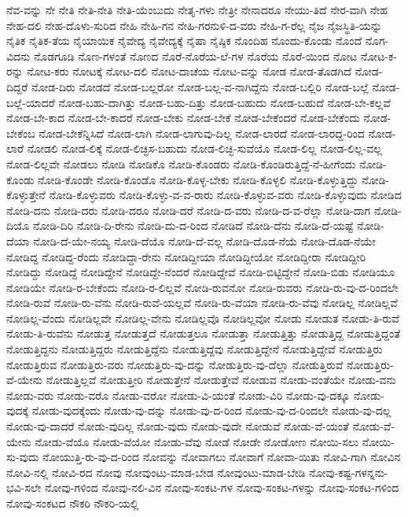 {ನೆವ-ವನ್ನು
ನೇ
ನೇತಿ
ನೇತಿ-ನೇತಿ
ನೇತಿ-ಯೆಂಬುದು
ನೇತೃ-ಗಳು
ನೇತ್ರೀ
ನೇನಾದರೂ
ನೇಯು-ತಿದೆ
ನೇರ-ವಾಗಿ
ನೇಹ
ನೇಹ-ದಲಿ
ನೇಹ-ದೊಳು-ಸುರಿದ
ನೇಹಿ
ನೇಹಿ-ಗನ
ನೇಹಿ-ಗರನುಳಿ-ದ-ವರು
ನೇಹಿ-ಗ-ರೆಲ್ಲ
ನೈಜ
ನೈಜಸ್ಥಿತಿ-ಯನ್ನು
ನೈತಿಕ
ನೈತಿಕ-ತೆಯ
ನೈಯಾಯಿಕ
ನೈವೇದ್ಯ
ನೈವೇದ್ಯಕ್ಕೆ
ನೈಷಾ
ನೈಷ್ಠಿಕ
ನೊಂದಿಹ
ನೊಂದು-ಕೊಂಡು
ನೊಂದೆ
ನೊಗ-ವಿದನು
ನೊಡಗೂಡಿ
ನೊಣ-ಗಳಂತೆ
ನೊಣದ
ನೊರೆ-ನೊರೆಯ-ಲೆ-ಗಳ
ನೊರೆಯ
ನೊರೆ-ಯಿಂದ
ನೋಟ
ನೋಟ-ಕ-ರನ್ನು
ನೋಟ-ಕರು
ನೋಟಕ್ಕೆ
ನೋಟ-ದಲಿ
ನೋಟ-ದಾಚೆಯ
ನೋಟ-ವನ್ನು
ನೋಡ
ನೋಡ-ತೊಡಗಿದೆ
ನೋಡ-ದಿದ್ದರೆ
ನೋಡ-ದಿರು
ನೋಡದೆ
ನೋಡ-ಬಲ್ಲರೋ
ನೋಡ-ಬಲ್ಲ-ವ-ನಾಗಿದ್ದೆನು
ನೋಡ-ಬಲ್ಲಿರಿ
ನೋಡ-ಬಲ್ಲೆ
ನೋಡ-ಬಲ್ಲೆ-ಯಾದರೆ
ನೋಡ-ಬಹು-ದಾಗಿತ್ತು
ನೋಡ-ಬಹು-ದಿತ್ತು
ನೋಡ-ಬಹುದು
ನೋಡ-ಬಹುದೆ
ನೋಡ-ಬೇ-ಕಲ್ಲವೆ
ನೋಡ-ಬೇ-ಕಾದ
ನೋಡ-ಬೇ-ಕಾದರೆ
ನೋಡ-ಬೇಕು
ನೋಡ-ಬೇಕೆ
ನೋಡ-ಬೇಕೆಂದರೆ
ನೋಡ-ಬೇಕೆಂದು
ನೋಡ-ಬೇಕೆಂಬ
ನೋಡ-ಬೇಕೆನ್ನಿಸಿದೆ
ನೋಡ-ಲಾಗಿ
ನೋಡ-ಲಾಗುವು-ದಿಲ್ಲ
ನೋಡ-ಲಾರದೆ
ನೋಡ-ಲಾರದ್ದ-ರಿಂದ
ನೋಡ-ಲಾರೆ
ನೋಡಲಿ
ನೋಡ-ಲಿಕ್ಕೆ
ನೋಡ-ಲಿಚ್ಛಿಸ-ಬಹುದು
ನೋಡ-ಲಿಚ್ಛಿ-ಸುವೆಯೊ
ನೋಡ-ಲಿಲ್ಲ
ನೋಡ-ಲಿಲ್ಲ-ವಲ್ಲ
ನೋಡ-ಲಿಲ್ಲವೇ
ನೋಡಲು
ನೋಡಿ
ನೋಡಿಕೊ
ನೋಡಿ-ಕೊಂಡರು
ನೋಡಿ-ಕೊಂಡಿರುತ್ತಿದ್ದೆ-ನೆ-ಹೀಗೆಂದು
ನೋಡಿ-ಕೊಂಡು
ನೋಡಿ-ಕೊಂಡೇ
ನೋಡಿ-ಕೊಂಡೊ
ನೋಡಿ-ಕೊಳ್ಳ-ಬೇಕು
ನೋಡಿ-ಕೊಳ್ಳಲಿ
ನೋಡಿ-ಕೊಳ್ಳುತ್ತಿದ್ದು
ನೋಡಿ-ಕೊಳ್ಳುತ್ತೇನೆ
ನೋಡಿ-ಕೊಳ್ಳುವರು
ನೋಡಿ-ಕೊಳ್ಳು-ವ-ವ-ರಾರು
ನೋಡಿ-ಕೊಳ್ಳುವ-ವರು
ನೋಡಿ-ಕೊಳ್ಳುವುದು
ನೋಡಿದ
ನೋಡಿ-ದನು
ನೋಡಿ-ದರು
ನೋಡಿ-ದರೂ
ನೋಡಿ-ದರೆ
ನೋಡಿ-ದ-ವರು
ನೋಡಿ-ದ-ವ-ರೆಲ್ಲಾ
ನೋಡಿ-ದಾಗ
ನೋಡಿ-ದಿಯೊ
ನೋಡಿ-ದಿರಿ
ನೋಡಿ-ದಿ-ರೇನು
ನೋಡಿ-ದು-ದ-ರಿಂದ
ನೋಡಿದೆ
ನೋಡಿ-ದೆನು
ನೋಡಿ-ದೆ-ಯಷ್ಟೆ
ನೋಡಿ-ದೆಯಾ
ನೋಡಿ-ದೆ-ಯೇ-ನಯ್ಯ
ನೋಡಿ-ದೆಯೊ
ನೋಡಿ-ದೆ-ವಲ್ಲ
ನೋಡಿ-ದೊಡ-ನೆಯೆ
ನೋಡಿ-ದೊಡ-ನೆಯೇ
ನೋಡಿದ್ದ
ನೋಡಿದ್ದ-ರೆಂದು
ನೋಡಿದ್ದಾ-ರೇನು
ನೋಡಿದ್ದೀಯಾ
ನೋಡಿದ್ದೀಯೋ
ನೋಡಿದ್ದೀರಾ
ನೋಡಿದ್ದೀರಿ
ನೋಡಿದ್ದು
ನೋಡಿದ್ದೆ
ನೋಡಿದ್ದೇನೆ
ನೋಡಿದ್ದೇ-ನೆಂದರೆ
ನೋಡಿದ್ದೇವೆ
ನೋಡಿ-ಬಿಟ್ಟಿದ್ದೇನೆ
ನೋಡಿ-ಬಿಡು
ನೋಡಿಯೂ
ನೋಡಿಯೇ
ನೋಡಿ-ರ-ಬೇಕೆಂದು
ನೋಡಿ-ರ-ಲಿಲ್ಲವೆ
ನೋಡಿ-ರುವನೋ
ನೋಡಿ-ರುವರು
ನೋಡಿ-ರು-ವು-ದ-ರಿಂದಲೇ
ನೋಡಿ-ರುವೆ
ನೋಡಿ-ರು-ವೆನು
ನೋಡಿ-ರುವೆ-ಯಲ್ಲವೆ
ನೋಡಿ-ರು-ವೆಯಾ
ನೋಡಿ-ರು-ವೆವು
ನೋಡಿಲ್ಲ
ನೋಡಿಲ್ಲವೆ
ನೋಡಿಲ್ಲ-ವೆಂದು
ನೋಡಿಲ್ಲವೇ
ನೋಡಿಲ್ಲ-ವೇನು
ನೋಡಿಲ್ಲವೊ
ನೋಡಿಲ್ಲವೋ
ನೋಡು
ನೋಡುತ
ನೋಡು-ತಿ-ರುವೆ
ನೋಡು-ತಿ-ರುವೆನು
ನೋಡುತ್ತ
ನೋಡುತ್ತದೆ
ನೋಡುತ್ತಲೂ
ನೋಡುತ್ತಾ
ನೋಡುತ್ತಿತ್ತು
ನೋಡುತ್ತಿದ್ದ
ನೋಡುತ್ತಿದ್ದಂತೆ
ನೋಡುತ್ತಿದ್ದನು
ನೋಡುತ್ತಿದ್ದರು
ನೋಡುತ್ತಿದ್ದೆನು
ನೋಡುತ್ತಿದ್ದೆವು
ನೋಡುತ್ತಿದ್ದೇನೆ
ನೋಡುತ್ತಿದ್ದೇವೆ
ನೋಡುತ್ತಿರು
ನೋಡುತ್ತಿರುವ
ನೋಡುತ್ತಿರು-ವರು
ನೋಡುತ್ತಿರು-ವು-ದನ್ನು
ನೋಡುತ್ತಿರು-ವು-ದೆಲ್ಲಾ
ನೋಡುತ್ತಿರುವೆ
ನೋಡುತ್ತಿರು-ವೆ-ಯೇನು
ನೋಡುತ್ತಿಲ್ಲವೆ
ನೋಡುತ್ತೀರಿ
ನೋಡುತ್ತೇನೆ
ನೋಡುತ್ತೇವೆ
ನೋಡುವ
ನೋಡು-ವಂತೆಯೇ
ನೋಡು-ವನು
ನೋಡು-ವರು
ನೋಡು-ವರೊ
ನೋಡು-ವರೋ
ನೋಡು-ವಿ-ಯಂತೆ
ನೋಡು-ವಿರಿ
ನೋಡು-ವು-ದಕ್ಕೂ
ನೋಡು-ವುದಕ್ಕೆ
ನೋಡು-ವುದಕ್ಕೆಂದು
ನೋಡು-ವು-ದನ್ನು
ನೋಡು-ವು-ದ-ರಿಂದ
ನೋಡು-ವು-ದ-ರಿಂದಲೇ
ನೋಡು-ವು-ದಲ್ಲ
ನೋಡು-ವು-ದಾದರೆ
ನೋಡು-ವುದಿಲ್ಲ
ನೋಡು-ವುದು
ನೋಡು-ವುದೇ
ನೋಡುವೆ
ನೋಡು-ವೆ-ಯಂತೆ
ನೋಡು-ವೆ-ಯೇನು
ನೋಡು-ವೆಯೊ
ನೋಡು-ವೆಯೋ
ನೋಡು-ವೆವು
ನೋಡೆ
ನೋಡೇ
ನೋಡೋಣ
ನೋಯಿ-ಸಲು
ನೋಯಿ-ಸು-ವುದು
ನೋಯುತ್ತಿ-ರು-ವು-ದ-ರಿಂದ
ನೋವನ್ನು
ನೋವಾಗಲು
ನೋವಾಗೆ
ನೋವಾ-ಯಿತು
ನೋವಿ-ಗಾಗಿ
ನೋವಿನ
ನೋವಿ-ನಲ್ಲಿ
ನೋವಿ-ರದ
ನೋವು
ನೋವುಂಟು-ಮಾಡ-ಬೇಡ
ನೋವುಂಟು-ಮಾಡ-ಬೇಡಿ
ನೋವು-ಕಷ್ಟ-ಗಳನ್ನನು-ಭವಿ-ಸಲೇ
ನೋವು-ಗಳಿಂದ
ನೋವು-ನಲಿ-ವಿನ
ನೋವು-ಸಂಕಟ-ಗಳ
ನೋವು-ಸಂಕಟ-ಗಳನ್ನು
ನೋವು-ಸಂಕಟ-ಗಳಿಂದ
ನೋವು-ಸಂಕಟದ
ನೌಕರಿ
ನೌಕರಿ-ಯಲ್ಲಿ
}
